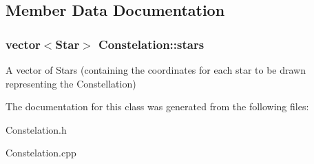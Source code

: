 \subsection{Member Data Documentation}
\hypertarget{classConstelation_a71d208ee2a6b57c32f28044ee7acad55}{
\subsubsection[{stars}]{\setlength{\rightskip}{0pt plus 5cm}vector$<${\bf Star}$>$ Constelation\-::stars}}\label{classConstelation_a71d208ee2a6b57c32f28044ee7acad55}
A vector of Stars (containing the coordinates for each star to be drawn representing the Constellation) 

The documentation for this class was generated from the following files\-:\begin{DoxyCompactItemize}
\item 
Constelation.\-h\item 
Constelation.\-cpp\end{DoxyCompactItemize}
